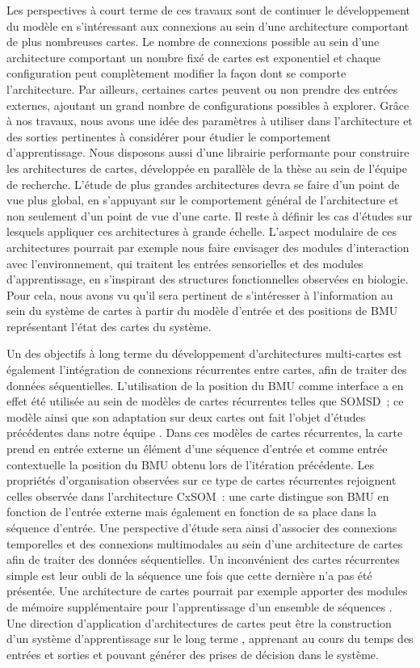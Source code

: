 Les perspectives à court terme de ces travaux sont de continuer le développement du modèle en s'intéressant aux connexions au sein d'une architecture comportant de plus nombreuses cartes.
Le nombre de connexions possible au sein d'une architecture comportant un nombre fixé de cartes est exponentiel et chaque configuration peut complètement modifier la façon dont se comporte l'architecture. Par ailleurs, certaines cartes peuvent ou non prendre des entrées externes, ajoutant un grand nombre de configurations possibles à explorer. Grâce à nos travaux, nous avons une idée des paramètres à utiliser dans l'architecture et des sorties pertinentes à considérer pour étudier le comportement d'apprentissage. Nous disposons aussi d'une librairie performante pour construire les architectures de cartes, développée en parallèle de la thèse au sein de l'équipe de recherche.
L'étude de plus grandes architectures devra se faire d'un point de vue plus global, en s'appuyant sur le comportement général de l'architecture et non seulement d'un point de vue d'une carte. Il reste à définir les cas d'études sur lesquels appliquer ces architectures à grande échelle.
L'aspect modulaire de ces architectures pourrait par exemple nous faire envisager des modules d'interaction avec l'environnement, qui traitent les entrées sensorielles et des modules d'apprentissage, en s'inspirant des structures fonctionnelles observées en biologie.
Pour cela, nous avons vu qu'il sera pertinent de s'intéresser à l'information au sein du système de cartes à partir du modèle d'entrée et des positions de BMU représentant l'état des cartes du système.

Un des objectifs à long terme du développement d'architectures multi-cartes est également l'intégration de connexions récurrentes entre cartes, afin de traiter des données séquentielles. L'utilisation de la position du BMU comme interface a en effet été utilisée au sein de modèles de cartes récurrentes telles que SOMSD~; ce modèle ainsi que son adaptation sur deux cartes ont fait l'objet d'études précédentes dans notre équipe \cite{baheux_towards_2014, fix20}. 
Dans ces modèles de cartes récurrentes, la carte prend en entrée externe un élément d'une séquence d'entrée et comme entrée contextuelle la position du BMU obtenu lors de l'itération précédente.
Les propriétés d'organisation observées sur ce type de cartes récurrentes rejoignent celles observée dans l'architecture CxSOM~: une carte distingue son BMU en fonction de l'entrée externe mais également en fonction de sa place dans la séquence d'entrée.
Une perspective d'étude sera ainsi d'associer des connexions temporelles et des connexions multimodales au sein d'une architecture de cartes afin de traiter des données séquentielles.
Un inconvénient des cartes récurrentes simple est leur oubli de la séquence une fois que cette dernière n'a pas été présentée. 
Une architecture de cartes pourrait par exemple apporter des modules de mémoire supplémentaire pour l'apprentissage d'un ensemble de séquences \cite{Ellefsen2015NeuralMH}.
Une direction d'application d'architectures de cartes peut être la construction d'un système d'apprentissage \og sur le long terme \fg{} , apprenant au cours du temps des entrées et sorties et pouvant générer des prises de décision dans le système.

